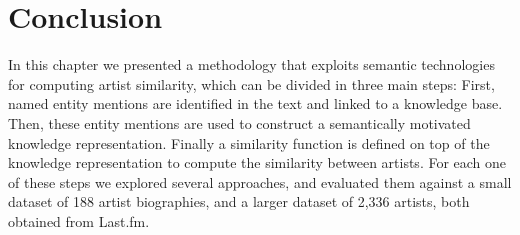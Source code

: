 
\section{Conclusion} %
\label{sec:similarity:conclusion}

In this chapter we presented a methodology that exploits semantic technologies for computing artist similarity, which can be divided in three main steps: First, named entity mentions are identified in the text and linked to a knowledge base. Then, these entity mentions are used to construct a semantically motivated knowledge representation.
Finally a similarity function is defined on top of the knowledge representation to compute the similarity between artists.
For each one of these steps we explored several approaches, and evaluated them against a small dataset of 188 artist biographies, and a larger dataset of 2,336 artists, both obtained from Last.fm.

